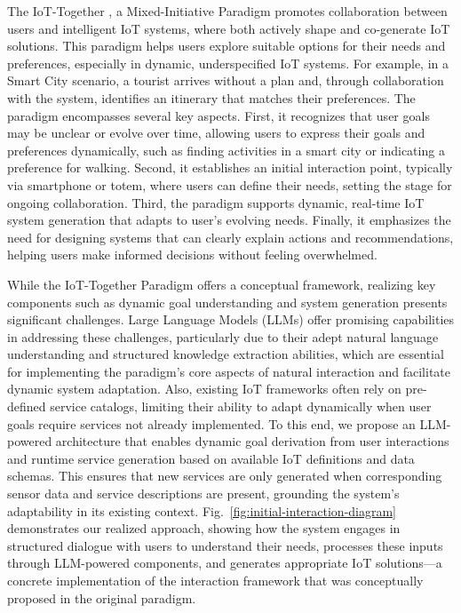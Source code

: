 
The IoT-Together \cite{spalazzese2023shaping}, a Mixed-Initiative Paradigm \cite{horvitz1999principles} promotes collaboration between users and intelligent IoT systems, where both actively shape and co-generate IoT solutions. This paradigm helps users explore suitable options for their needs and preferences, especially in dynamic, underspecified IoT systems. For example, in a Smart City scenario, a tourist arrives without a plan and, through collaboration with the system, identifies an itinerary that matches their preferences. The paradigm encompasses several key aspects. First, it recognizes that user goals may be unclear or evolve over time, allowing users to express their goals and preferences dynamically, such as finding activities in a smart city or indicating a preference for walking. Second, it establishes an initial interaction point, typically via smartphone or totem, where users can define their needs, setting the stage for ongoing collaboration. Third, the paradigm supports dynamic, real-time IoT system generation that adapts to user's evolving needs. Finally, it emphasizes the need for designing systems that can clearly explain actions and recommendations, helping users make informed decisions without feeling overwhelmed.


While the IoT-Together Paradigm offers a conceptual framework, realizing key components such as dynamic goal understanding and system generation presents significant challenges. Large Language Models (LLMs) offer promising capabilities in addressing these challenges, particularly due to their adept natural language understanding and structured knowledge extraction abilities, which are essential for implementing the paradigm's core aspects of natural interaction and facilitate dynamic system adaptation\cite{he2024doespromptformattingimpact}. Also, existing IoT frameworks often rely on pre-defined service catalogs, limiting their ability to adapt dynamically when user goals require services not already implemented\cite{7479556}. To this end, we propose an LLM-powered architecture that enables dynamic goal derivation from user interactions and runtime service generation based on available IoT definitions and data schemas. This ensures that new services are only generated when corresponding sensor data and service descriptions are present, grounding the system's adaptability in its existing context. Fig.~\ref{fig:initial-interaction-diagram} demonstrates our realized approach, showing how the system engages in structured dialogue with users to understand their needs, processes these inputs through LLM-powered components, and generates appropriate IoT solutions—a concrete implementation of the interaction framework that was conceptually proposed in the original paradigm.






